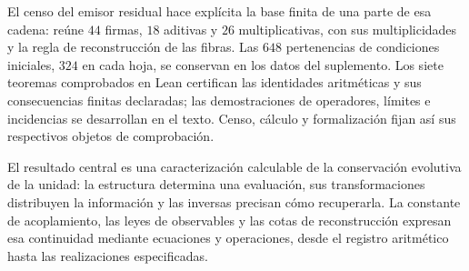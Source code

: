 El censo del emisor residual hace explícita la base finita de una parte de esa cadena: reúne \(44\) firmas, \(18\) aditivas y \(26\) multiplicativas, con sus multiplicidades y la regla de reconstrucción de las fibras. Las \(648\) pertenencias de condiciones iniciales, \(324\) en cada hoja, se conservan en los datos del suplemento. Los siete teoremas comprobados en Lean certifican las identidades aritméticas y sus consecuencias finitas declaradas; las demostraciones de operadores, límites e incidencias se desarrollan en el texto. Censo, cálculo y formalización fijan así sus respectivos objetos de comprobación.

El resultado central es una caracterización calculable de la conservación evolutiva de la unidad: la estructura determina una evaluación, sus transformaciones distribuyen la información y las inversas precisan cómo recuperarla. La constante de acoplamiento, las leyes de observables y las cotas de reconstrucción expresan esa continuidad mediante ecuaciones y operaciones, desde el registro aritmético hasta las realizaciones especificadas.
